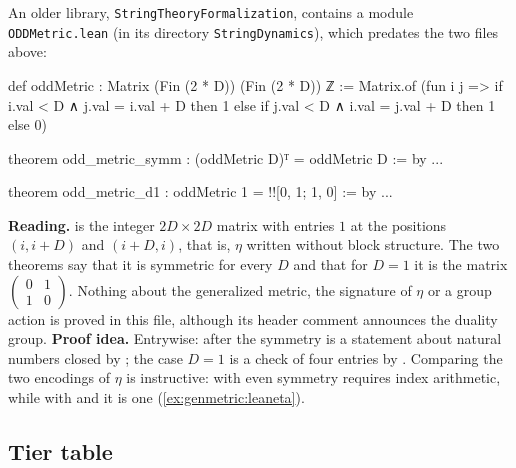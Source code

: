An older library, \texttt{StringTheoryFormalization}, contains a module
\texttt{ODDMetric.lean} (in its directory \texttt{StringDynamics}), which predates the two
files above:
\begin{leanbox}
\begin{leancode}
def oddMetric : Matrix (Fin (2 * D)) (Fin (2 * D)) ℤ :=
  Matrix.of (fun i j =>
    if i.val < D ∧ j.val = i.val + D then 1
    else if j.val < D ∧ i.val = j.val + D then 1
    else 0)

theorem odd_metric_symm : (oddMetric D)ᵀ = oddMetric D := by ...

theorem odd_metric_d1 : oddMetric 1 = !![0, 1; 1, 0] := by ...
\end{leancode}
\textbf{Reading.}  is the integer $2D\times2D$ matrix with entries $1$ at
the positions $(i,i+D)$ and $(i+D,i)$, that is, $\eta$ written without block structure.
The two theorems say that it is symmetric for every $D$ and that for $D=1$ it is the
matrix $\left(\begin{smallmatrix}0&1\\1&0\end{smallmatrix}\right)$. Nothing about the
generalized metric, the signature of $\eta$ or a group action is proved in this file,
although its header comment announces the duality group. \textbf{Proof idea.} Entrywise: after  the symmetry is a
statement about natural numbers closed by ; the case $D=1$ is a check of four
entries by . Comparing the two encodings of $\eta$ is instructive: with
 even symmetry requires index arithmetic, while with
 and  it is one 
(\cref{ex:genmetric:leaneta}).
\end{leanbox}

\subsection{Tier table}

